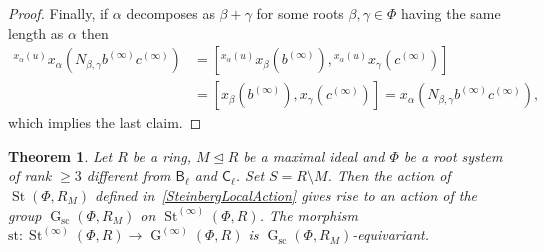 \documentclass[oneside, 11pt]{amsart}
\numberwithin{equation}{section}
\newtheorem{theorem}{Theorem}
\theoremstyle{definition}
\theoremstyle{remark}
\DeclareMathOperator\St{St}
\DeclareMathOperator\GG{G}
\newcommand{\up}[2]{{^{#1}\!{#2}}}
\newcommand{\rB}{\mathsf{B}}
\newcommand{\rC}{\mathsf{C}}
\begin{document}
\begin{proof}
 Finally, if $\alpha$ decomposes as $\beta + \gamma$ for some roots \(\beta, \gamma \in \Phi\) having the same length as $\alpha$ then \begin{align*}
  \up{x_\alpha(u)}{x_\alpha(N_{\beta, \gamma} b^{(\infty)} c^{(\infty)})} &= [\up{x_\alpha(u)}{x_\beta(b^{(\infty)})}, \up{x_\alpha(u)}{x_\gamma(c^{(\infty)})}]\\
  &= [x_\beta(b^{(\infty)}), x_\gamma(c^{(\infty)})] = x_\alpha(N_{\beta, \gamma} b^{(\infty)} c^{(\infty)}),
 \end{align*}
 which implies the last claim.
\end{proof}

\begin{theorem}\label{ChevalleyLocalAction}
 Let \(R\) be a ring, \(M \trianglelefteq R\) be a maximal ideal and \(\Phi\) be a root system of rank \(\geq 3\) different from \(\rB_\ell\) and \(\rC_\ell\). Set \(S = R \setminus M\). Then the action of $\St(\Phi, R_M)$ defined in~\cref{SteinbergLocalAction} gives rise to an action of the group \(\GG_{\mathrm{sc}}(\Phi, R_M)\) on \(\St^{(\infty)}(\Phi, R)\). The morphism \(\mathrm{st} \colon \St^{(\infty)}(\Phi, R) \to \GG^{(\infty)}(\Phi, R)\) is \(\GG_{\mathrm{sc}}(\Phi, R_M)\)-equivariant.
\end{theorem}
\end{document}
